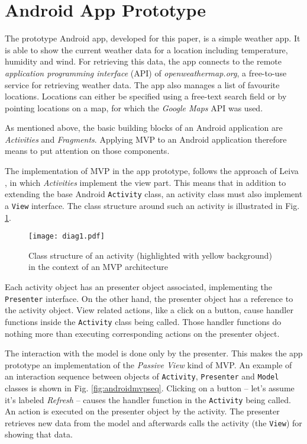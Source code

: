 
\section{Android App Prototype}

The prototype Android app, developed for this paper, is a simple weather app. It is able to show the current weather data for a location including temperature, humidity and wind. For retrieving this data, the app connects to the remote \emph{application programming interface} (API) of \emph{openweathermap.org}, a free-to-use service for retrieving weather data. The app also manages a list of favourite locations. Locations can either be specified using a free-text search field or by pointing locations on a map, for which the \emph{Google Maps} API was used.

As mentioned above, the basic building blocks of an Android application are \emph{Activities} and \emph{Fragments}. Applying MVP to an Android application therefore means to put attention on those components.

The implementation of MVP in the app prototype, follows the approach of Leiva \cite{AntLeiv14}, in which \emph{Activities} implement the view part. This means that in addition to extending the base Android \texttt{Activity} class, an activity class must also implement a \texttt{View} interface. The class structure around such an activity is illustrated in Fig. \ref{fig:androidmvp}.

\begin{figure}[h]
\centering
\texttt{[image: diag1.pdf]}
\caption{Class structure of an activity (highlighted with yellow background) in the context of an MVP architecture}
\label{fig:androidmvp}
\end{figure}

Each activity object has an presenter object associated, implementing the \texttt{Presenter} interface. On the other hand, the presenter object has a reference to the activity object. View related actions, like a click on a button, cause handler functions inside the \texttt{Activity} class being called. Those handler functions do nothing more than executing corresponding actions on the presenter object.

The interaction with the model is done only by the presenter. This makes the app prototype an implementation of the \emph{Passive View} kind of MVP.
An example of an interaction sequence between objects of \texttt{Activity}, \texttt{Presenter} and \texttt{Model} classes is shown in Fig. \ref{fig:androidmvpseq}. Clicking on a button -- let's assume it's labeled \emph{Refresh} -- causes the handler function in the \texttt{Activity} being called. An action is executed on the presenter object by the activity. The presenter retrieves new data from the model and afterwards calls the activity (the \texttt{View}) for showing that data.

